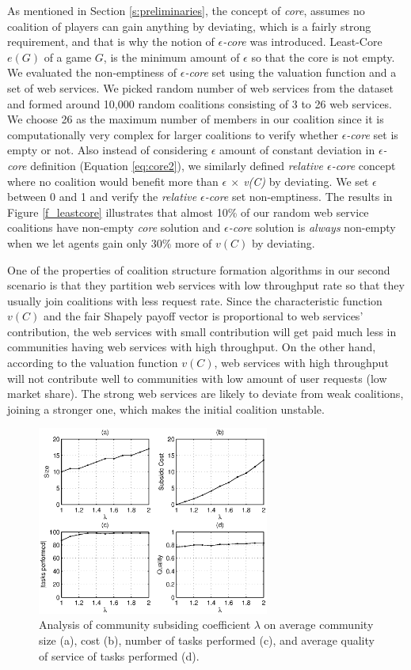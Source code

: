 \documentclass[10pt,journal,cspaper,compsoc]{IEEEtran}
\begin{document}
As mentioned in Section \ref{s:preliminaries}, the concept of
\emph{core}, assumes no coalition of players can gain anything by
deviating, which is a fairly strong requirement, and that is why
the notion of \emph{$\epsilon$-core} was introduced. Least-Core
$e(G)$ of a game $G$, is the minimum amount of $\epsilon$ so that
the core is not empty. We evaluated the non-emptiness of \emph{$\epsilon$-core} set using the
valuation function and a set of web services. We picked random
number of web services from the dataset and formed around 10,000
random coalitions consisting of 3 to 26 web services. We choose 26
as the maximum number of members in our coalition since it
is computationally very complex for larger coalitions to verify whether
\emph{$\epsilon$-core} set is empty or not. Also instead of considering $\epsilon$ amount of constant deviation in \emph{$\epsilon$-core} definition (Equation \ref{eq:core2}), we similarly defined \emph{relative $\epsilon$-core} concept where no coalition would benefit more than \emph{$\epsilon$ $\times$ v(C)} by deviating. We set $\epsilon$ between 0 and 1 and verify the \emph{relative $\epsilon$-core} set non-emptiness. The results in Figure
\ref{f_leastcore} illustrates that almost 10\% of our random web
service coalitions have non-empty \emph{core} solution and
\emph{$\epsilon$-core} solution is \emph{always} non-empty when we
let agents gain only 30\% more of $v(C)$ by deviating.

One of the properties of coalition structure formation algorithms
in our second scenario is that they partition web services with low
throughput rate so that they usually join coalitions with less
request rate. Since the characteristic function $v(C)$ and the
fair Shapely payoff vector is proportional to web services'
contribution, the web services with small contribution will get
paid much less in communities having web services with high
throughput. On the other hand, according to the valuation function
$v(C)$, web services with high throughput will not contribute well
to communities with low amount of user requests (low market
share). The strong web services are likely to deviate from weak
coalitions, joining a stronger one, which makes the initial
coalition unstable.


\begin{figure}[!t]
\centering
\includegraphics[width=3in]{taxtation.eps}
\caption{Analysis of community subsiding coefficient $\lambda$ on average community size (a), cost (b), number of tasks performed (c), and average quality of service of tasks performed (d).} \label{f_taxtation}
\end{figure}
\end{document}
